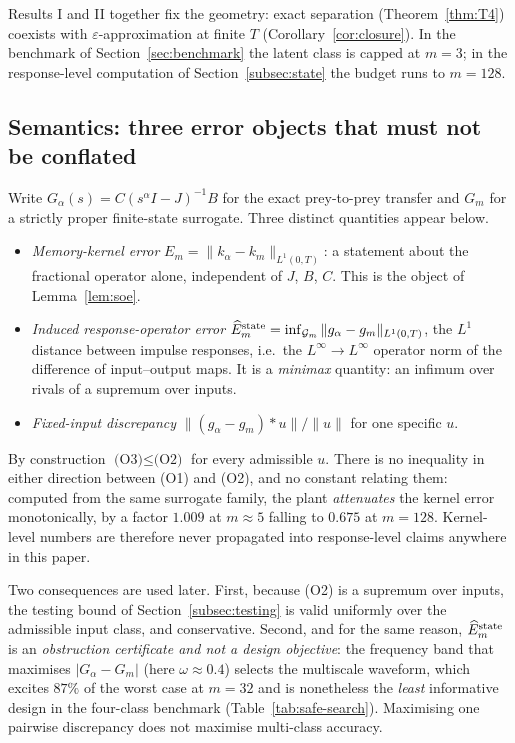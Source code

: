 Results I and II together fix the geometry: exact separation (Theorem~\ref{thm:T4}) coexists with $\varepsilon$-approximation at finite $T$ (Corollary~\ref{cor:closure}). In the benchmark of Section~\ref{sec:benchmark} the latent class is capped at $m=3$; in the response-level computation of Section~\ref{subsec:state} the budget runs to $m=128$.

\subsection{Semantics: three error objects that must not be conflated}
\label{subsec:semantics}
Write $G_\alpha(s)=C(s^\alpha I-J)^{-1}B$ for the exact prey-to-prey transfer and $G_m$ for a strictly proper finite-state surrogate. Three distinct quantities appear below.
\begin{itemize}
\item[(O1)] \emph{Memory-kernel error} $E_m=\|k_\alpha-k_m\|_{L^1(0,T)}$: a statement about the fractional operator alone, independent of $J$, $B$, $C$. This is the object of Lemma~\ref{lem:soe}.
\item[(O2)] \emph{Induced response-operator error} $\widehat E_m^{\rm state}=\inf_{\mathcal G_m}\|g_\alpha-g_m\|_{L^1(0,T)}$, the $L^1$ distance between impulse responses, i.e.\ the $L^\infty\!\to\!L^\infty$ operator norm of the difference of input--output maps. It is a \emph{minimax} quantity: an infimum over rivals of a supremum over inputs.
\item[(O3)] \emph{Fixed-input discrepancy} $\|(g_\alpha-g_m)*u\|/\|u\|$ for one specific $u$.
\end{itemize}
By construction $\text{(O3)}\le\text{(O2)}$ for every admissible $u$. There is no inequality in either direction between (O1) and (O2), and no constant relating them: computed from the same surrogate family, the plant \emph{attenuates} the kernel error monotonically, by a factor $1.009$ at $m\approx5$ falling to $0.675$ at $m=128$. Kernel-level numbers are therefore never propagated into response-level claims anywhere in this paper.

Two consequences are used later. First, because (O2) is a supremum over inputs, the testing bound of Section~\ref{subsec:testing} is valid uniformly over the admissible input class, and conservative. Second, and for the same reason, $\widehat E_m^{\rm state}$ is an \emph{obstruction certificate and not a design objective}: the frequency band that maximises $|G_\alpha-G_m|$ (here $\omega\approx0.4$) selects the multiscale waveform, which excites $87\%$ of the worst case at $m=32$ and is nonetheless the \emph{least} informative design in the four-class benchmark (Table~\ref{tab:safe-search}). Maximising one pairwise discrepancy does not maximise multi-class accuracy.

